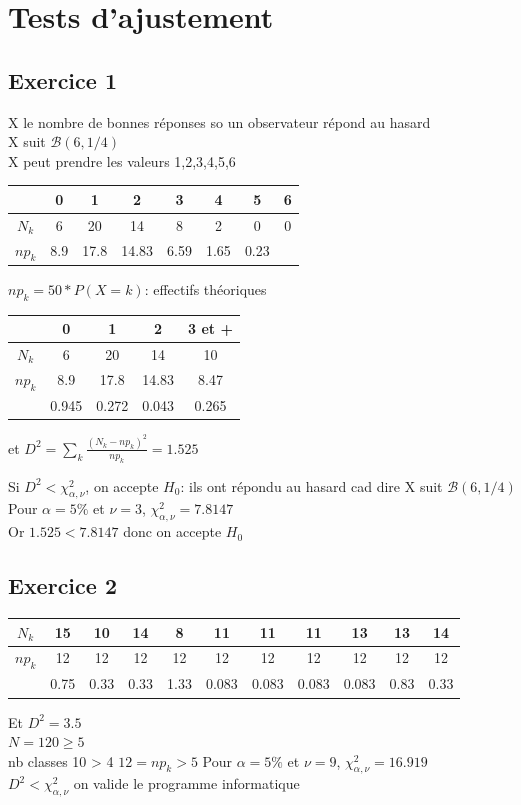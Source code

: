\documentclass[12pt]{report}
\begin{document}
\chapter*{Tests d'ajustement}

\section{Exercice 1}

X le nombre de bonnes réponses so un observateur répond au hasard\\
X suit $\mathcal{B}(6,1/4)$\\
X peut prendre les valeurs 1,2,3,4,5,6\\
\begin{tabular}{|c|c|c|c|c|c|c|c|}
    \hline
    &0&1&2&3&4&5&6\\
    \hline
    $N_k$&6&20&14&8&2&0&0\\
    \hline  
    $np_k$&8.9&17.8&14.83&6.59&1.65&0.23&\\
    \hline  
\end{tabular}
$np_k = 50 * P(X=k)$: effectifs théoriques\\
\begin{tabular}{|c|c|c|c|c|}
    \hline
    &0&1&2&3 et +\\
    \hline
    $N_k$&6&20&14&10\\
    \hline  
    $np_k$&8.9&17.8&14.83&8.47\\
    \hline  
    &0.945&0.272&0.043&0.265\\
    \hline
\end{tabular}
et $D^2 = \sum_k \frac{(N_k-np_k)^2}{np_k} = 1.525$ 

Si $D^2 < \chi_{\alpha,\nu}^2$, on accepte $H_0$: ils ont répondu au hasard cad dire X suit $\mathcal{B}(6,1/4)$\\
Pour $\alpha = 5\%$ et $\nu = 3$, $\chi_{\alpha,\nu}^2 = 7.8147$\\
Or $1.525 < 7.8147$ donc on accepte $H_0$

\section{Exercice 2}

\begin{tabular}{|c|c|c|c|c|c|c|c|c|c|c|}
    \hline
    $N_k$&15&10&14&8&11&11&11&13&13&14\\
    \hline  
    $np_k$&12&12&12&12&12&12&12&12&12&12\\
    \hline  
    &0.75&0.33&0.33&1.33&0.083&0.083&0.083&0.083&0.83&0.33\\
    \hline
\end{tabular}
Et $D^2 = 3.5$\\
$N = 120 \geq 5$\\
nb classes 10 > 4
$12 = np_k > 5$
Pour $\alpha = 5\%$ et $\nu = 9$, $\chi_{\alpha,\nu}^2 = 16.919$\\
$D^2 < \chi_{\alpha,\nu}^2$ on valide le programme informatique
\end{document}
